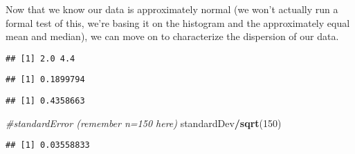 \documentclass[
]{article}
\newenvironment{Shaded}{\begin{snugshade}}{\end{snugshade}}
\newcommand{\CommentTok}[1]{\textcolor[rgb]{0.56,0.35,0.01}{\textit{#1}}}
\newcommand{\DecValTok}[1]{\textcolor[rgb]{0.00,0.00,0.81}{#1}}
\newcommand{\KeywordTok}[1]{\textcolor[rgb]{0.13,0.29,0.53}{\textbf{#1}}}
\newcommand{\NormalTok}[1]{#1}
\newcommand{\OperatorTok}[1]{\textcolor[rgb]{0.81,0.36,0.00}{\textbf{#1}}}
\newcommand{\StringTok}[1]{\textcolor[rgb]{0.31,0.60,0.02}{#1}}
\begin{document}
Now that we know our data is approximately normal (we won't actually run
a formal test of this, we're basing it on the histogram and the
approximately equal mean and median), we can move on to characterize the
dispersion of our data.

\begin{Shaded}
\end{Shaded}

\begin{verbatim}
## [1] 2.0 4.4
\end{verbatim}

\begin{Shaded}
\end{Shaded}

\begin{verbatim}
## [1] 0.1899794
\end{verbatim}

\begin{Shaded}
\end{Shaded}

\begin{verbatim}
## [1] 0.4358663
\end{verbatim}

\begin{Shaded}
\begin{Highlighting}[]
\CommentTok{\#standardError (remember n=150 here)}
\NormalTok{standardDev}\OperatorTok{/}\KeywordTok{sqrt}\NormalTok{(}\DecValTok{150}\NormalTok{)}
\end{Highlighting}
\end{Shaded}

\begin{verbatim}
## [1] 0.03558833
\end{verbatim}
\end{document}
